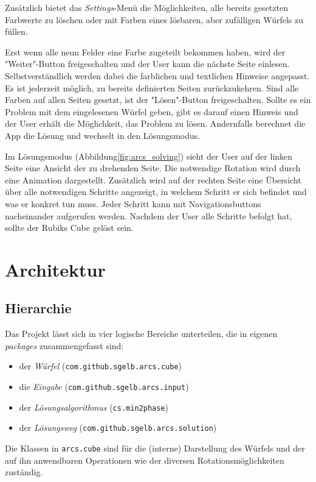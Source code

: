 Zusätzlich bietet das \emph{Settings}-Menü die Möglichkeiten, alle bereits
gesetzten Farbwerte zu löschen oder mit Farben eines lösbaren, aber zufälligen
Würfels zu füllen.

Erst wenn alle neun Felder eine Farbe zugeteilt bekommen haben, wird der
"Weiter"-Button freigeschalten und der User kann die nächste Seite einlesen.
Selbstverständlich werden dabei die farblichen und textlichen Hinweise
angepasst. Es ist jederzeit möglich, zu bereits definierten Seiten
zurückzukehren. Sind alle Farben auf allen Seiten gesetzt, ist der
"Lösen"-Button freigeschalten. Sollte es ein Problem mit dem eingelesenen Würfel
geben, gibt es darauf einen Hinweis und der User erhält die Möglichkeit, das
Problem zu lösen. Andernfalls berechnet die App die Lösung und wechselt in den
Lösungsmodus.

Im Lösungsmodus (Abbildung\ref{fig:arcs_solving}) sieht der User auf der linken
Seite eine Ansicht der zu drehenden Seite. Die notwendige Rotation wird durch
eine Animation dargestellt. Zusätzlich wird auf der rechten Seite eine Übersicht
über alle notwendigen Schritte angezeigt, in welchem Schritt er sich befindet
und was er konkret tun muss. Jeder Schritt kann mit Navigationsbuttons
nacheinander aufgerufen werden. Nachdem der User alle Schritte befolgt hat,
sollte der Rubiks Cube gelöst sein.

\section{Architektur}  %

\subsection{Hierarchie}  %

Das Projekt lässt sich in vier logische Bereiche unterteilen, die in eigenen
\emph{packages} zusammengefasst sind:

\begin{itemize}
  \item der \emph{Würfel} (\texttt{com.github.sgelb.arcs.cube})
  \item die \emph{Eingabe} (\texttt{com.github.sgelb.arcs.input})
  \item der \emph{Lösungsalgorithmus} (\texttt{cs.min2phase})
  \item der \emph{Lösungsweg} (\texttt{com.github.sgelb.arcs.solution})
\end{itemize}

Die Klassen in \texttt{arcs.cube} sind für die (interne) Darstellung des Würfels
und der auf ihn anwendbaren Operationen wie der diversen Rotationsmöglichkeiten
zuständig.

